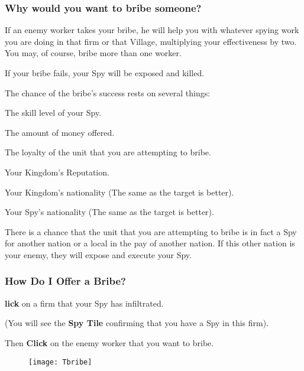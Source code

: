 \subsubsection{\textsf{Why would you want to bribe someone?}}

If an enemy worker takes your bribe, he will help you with whatever spying work you are doing in that firm or that Village, multiplying your effectiveness by two. You may, of course, bribe more than one worker.

If your bribe fails, your Spy will be exposed and killed.

The chance of the bribe’s success rests on several things:

\begin{changemargin}{.5cm}{0cm}
The skill level of your Spy.

The amount of money offered.

The loyalty of the unit that you are attempting to bribe.

Your Kingdom’s Reputation.

Your Kingdom’s nationality (The same as the target is better).

Your Spy’s nationality (The same as the target is better).
\end{changemargin}

There is a chance that the unit that you are attempting to bribe is in fact a Spy for another nation or a local in the pay of another nation. If this other nation is your enemy, they will expose and execute your Spy.

\subsubsection{\textsf{How Do I Offer a Bribe?}}

\textbf{lick} on a firm that your Spy has infiltrated.

(You will see the \textbf{Spy Tile} confirming that you have a Spy in this firm).

Then \textbf{Click} on the enemy worker that you want to bribe.

\begin{wrapfigure}{r}{0.1\textwidth}
    \vspace{-20pt}
    \begin{center}
        \texttt{[image: Tbribe]}
    \end{center}
    \vspace{-20pt}
\end{wrapfigure}

